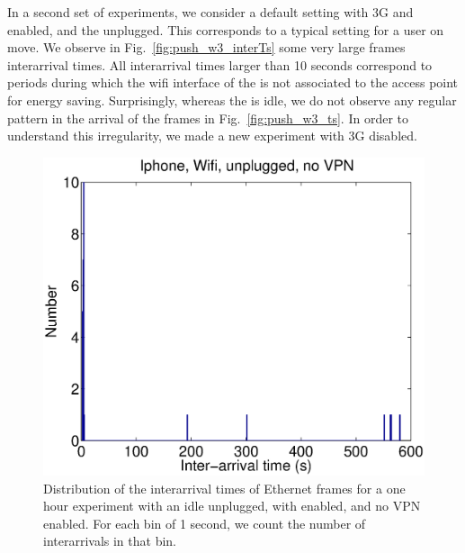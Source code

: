 In a second set of experiments, we consider a default \iphone{}
setting with 3G and \wifi{} enabled, and the \iphone{} unplugged. This
corresponds to a typical setting for a user on move.  We observe in
Fig.~\ref{fig:push_w3_interTs} some very large frames interarrival
times. All interarrival times larger than 10 seconds correspond to
periods during which the wifi interface of the \iphone{} is not
associated to the access point for energy saving. Surprisingly,
whereas the \iphone{} is idle, we do not observe any regular pattern
in the arrival of the frames in Fig.~\ref{fig:push_w3_ts}. In order to
understand this irregularity, we made a new experiment with 3G
disabled.


\begin{figure}
\centering
        \includegraphics[width=0.8\linewidth]{../../code/pushNotification/Fig/bw_iphone_wifi_unplug_novpn_interTs.eps}
  \caption{Distribution of the interarrival times of Ethernet frames
    for a one hour experiment with an idle \iphone{} unplugged, with \wifi{} 
    enabled, and no VPN enabled. For each bin of 1 second, we count
    the number of interarrivals in that bin.}
  \label{fig:push_w_interTs}
\end{figure}

